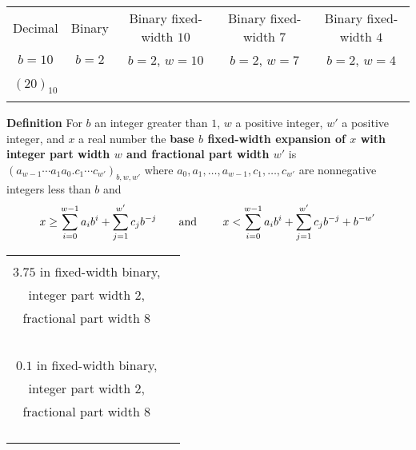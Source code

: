 \documentclass[12pt, oneside]{article}
\begin{document}
\begin{center}
    \begin{tabular}{|c|c|c|c|c|}
    \hline
    Decimal &  Binary  & Binary fixed-width $10$& Binary fixed-width $7$ & Binary fixed-width $4$\\
    $b=10$ & $b=2$ & $b=2$, $w =  10$& $b=2$, $w =  7$& $b=2$, $w =  4$ \\
    \hline 
    &&&&  \\
    $(20)_{10}$&\phantom{$(10100)_{2}$\qquad\qquad}&&  &\\
    &&&&  \\
\hline
    \end{tabular}
    \end{center}
 

{\bf Definition} For $b$ an integer greater than $1$, $w$ a positive integer, 
$w'$ a positive  integer, and $x$ a real number the {\bf base $b$ fixed-width 
expansion of $x$ with integer part width $w$  and fractional part width $w'$} is
$(a_{w-1} \cdots a_1 a_0 .  c_{1} \cdots c_{w'})_{b,w,w'}$
where  $a_0, a_1, \ldots, a_{w-1}, c_1, \ldots, c_{w'}$ are nonnegative integers less than $b$ and
$$x \geq \sum_{i=0}^{w-1} a_{i} b^{i} + \sum_{j=1}^{w'}  c_{j} b^{-j} \hfill
\textrm{\qquad and \qquad}
\hfill x < \sum_{i=0}^{w-1} a_{i} b^{i} + \sum_{j=1}^{w'} c_{j} b^{-j} + b^{-w'}$$

\begin{center}
\begin{tabular}{|c|p{5in}|}
\hline
& \\
$3.75$  in fixed-width binary,& \\
integer part width $2$,&\\
 fractional part width $8$ & \\
& \\
& \\
& \\
& \\
\hline
& \\
$0.1$  in fixed-width binary, & \\
integer part width $2$, &\\
 fractional part width $8$ & \\
 & \\
 & \\
 & \\
 & \\
 \hline
\end{tabular}
\end{center}

\vfill
\end{document}
